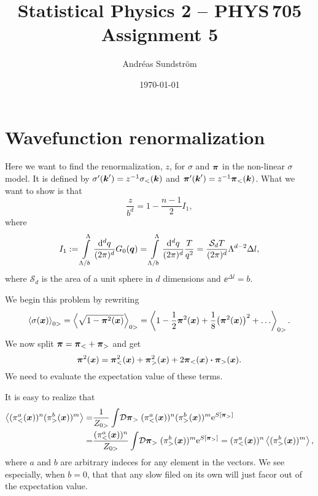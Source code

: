 \documentclass[11pt,letter, swedish, english
]{article}
\begin{document}




\title{Statistical Physics 2 -- PHYS\,705 \\
Assignment 5}
\author{Andréas Sundström}
\date{\today}

\maketitle


\section{Wavefunction renormalization}
Here we want to find the renormalization, $z$, for $\sigma$ and
$\vb*\pi$ in the non-linear $\sigma$ model. It is defined by 
$\sigma'(\vb*k') = z^{-1}\sigma_<(\vb*k)$ and
$\vb*\pi'(\vb*k') = z^{-1}\vb*\pi_<(\vb*k)$. What we want to show is
that
\begin{equation}\label{eq:1_want}
\frac{z}{b^{d}} = 1 -\frac{n-1}{2}I_1,
\end{equation}
where
\begin{equation}
I_1:= \int_{\Lambda/b}^\Lambda \frac{\rd^dq}{(2\pi)^d}G_0(\vb*q)
= \int_{\Lambda/b}^\Lambda \frac{\rd^dq}{(2\pi)^d} \frac{T}{q^2}
= \frac{\mathcal{S}_d T}{(2\pi)^d} \Lambda^{d-2} \Delta{l},
\end{equation}
where $\mathcal{S}_d$ is the area of a unit sphere in $d$ dimensions
and $\ee^{\Delta{l}} = b$.


We begin this problem by rewriting
\begin{equation}\label{eq:1_ev-sigma}
\ev{\sigma(\vb*x)}_{0>} 
= \ev{\sqrt{1-\vb*\pi^2(\vb*x)}}_{0>} 
= \ev{1-\frac{1}{2}\vb*\pi^2(\vb*x) 
+\frac{1}{8}\qty(\vb*\pi^2(\vb*x))^2
+\ldots}_{0>}.
\end{equation}
We now split $\vb*\pi = \vb*\pi_< + \vb*\pi_>$ and get
\begin{equation}
\vb*\pi^2(\vb*x) = 
\vb*\pi_<^2(\vb*x) + \vb*\pi_>^2(\vb*x) 
+2\vb*\pi_<(\vb*x)\vdot\vb*\pi_>(\vb*x).
\end{equation}
We need to evaluate the expectation value of these terms.

It is easy to realize that 
\begin{equation}
\begin{aligned}
\ev{(\pi_<^a(\vb*x))^n(\pi_>^b(\vb*x))^m}
=&\frac{1}{Z_{0>}}
\int\!\mathcal{D}\vb*\pi_>\; (\pi_<^a(\vb*x))^n(\pi_>^b(\vb*x))^m
\ee^{S[\vb*\pi_>]}\\
=& \frac{(\pi_<^a(\vb*x))^n}{Z_{0>}}
\int\!\mathcal{D}\vb*\pi_>\; (\pi_>^b(\vb*x))^m \ee^{S[\vb*\pi_>]}
=(\pi_<^a(\vb*x))^n\ev{(\pi_>^b(\vb*x))^m},
\end{aligned}
\end{equation}
where $a$ and $b$ are arbitrary indeces for any element in the
vectors. We see especially, when $b=0$, that that any slow filed on
its own will just facor out of the expectation value. 
\end{document}
